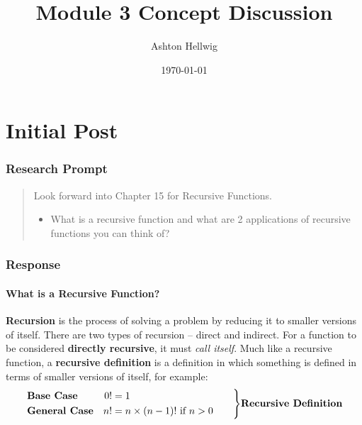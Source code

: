 \documentclass[12pt]{article}
\title{Module 3 Concept Discussion}
\author{Ashton Hellwig}
\date{\today}
\theoremstyle{definition}
\theoremstyle{plain}
\newenvironment{ldefinitions}
    {\left.\begin{aligned}}
    {\end{aligned}\right\rbrace}
\begin{document}
  \maketitle
  \tableofcontents
  \lstlistoflistings
  \newpage


  \part{Initial Post}

    \section{Research Prompt}
      \begin{quote}
        Look forward into Chapter 15 for Recursive
        Functions.
        \begin{itemize}
          \item What is a recursive function and what are 2 applications of
            recursive functions you can think of?
        \end{itemize}
      \end{quote}

    \section{Response}
      \subsection{What is a Recursive Function?}
        \textbf{Recursion} is the process of solving a problem by reducing it to
          smaller versions of itself. There are two types of recursion -- direct
          and indirect. For a function to be considered
          \textbf{directly recursive}, it must \textit{call itself}. Much like
          a recursive function, a \textbf{recursive definition} is a definition
          in which something is defined in terms of smaller versions of itself,
          for example:
          \begin{equation}
            \begin{ldefinitions}
              & \text{\textbf{Base Case}} & 0! &= 1 \\
              &\text{\textbf{General Case}} & n!&=n\times (n-1)!\text{ if }n>0
              \hspace{20pt}
            \end{ldefinitions}
            \text{\textbf{Recursive Definition}}
          \end{equation}
\end{document}
